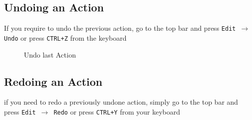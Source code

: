 \documentclass[a4paper]{article}
\begin{document}
{\subsection{Undoing an Action} 
If you require to undo the previous action, go to the top bar and press \texttt{Edit $\rightarrow$ Undo} or press \texttt{CTRL+Z} from the keyboard
\begin{figure}[H] \begin{center} 
\label{fig:undo}
\caption{Undo last Action}
\vspace{-20pt}
\end{center} \end{figure} 
\newpage
\subsection{Redoing an Action} 
if you need to redo a previously undone action, simply go to the top bar and press \texttt{Edit $\rightarrow$ Redo} or press \texttt{CTRL+Y} from your keyboard

}
\end{document}
